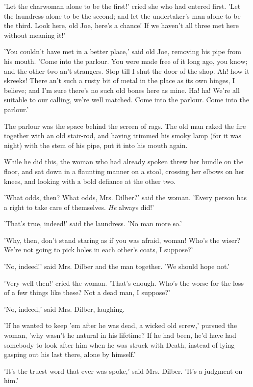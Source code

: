 'Let the charwoman alone to be the first!' cried she who had entered
first. 'Let the laundress alone to be the second; and let the
undertaker's man alone to be the third. Look here, old Joe, here's a
chance! If we haven't all three met here without meaning it!'

'You couldn't have met in a better place,' said old Joe, removing his
pipe from his mouth. 'Come into the parlour. You were made free of it
long ago, you know; and the other two an't strangers. Stop till I shut
the door of the shop. Ah! how it skreeks! There an't such a rusty bit of
metal in the place as its own hinges, I believe; and I'm sure there's no
such old bones here as mine. Ha! ha! We're all suitable to our calling,
we're well matched. Come into the parlour. Come into the parlour.'

The parlour was the space behind the screen of rags. The old man raked
the fire together with an old stair-rod, and having trimmed his smoky
lamp (for it was night) with the stem of his pipe, put it into his mouth
again.

While he did this, the woman who had already spoken threw her bundle on
the floor, and sat down in a flaunting manner on a stool, crossing her
elbows on her knees, and looking with a bold defiance at the other two.

'What odds, then? What odds, Mrs. Dilber?' said the woman. 'Every person
has a right to take care of themselves. \emph{He} always did!'

'That's true, indeed!' said the laundress. 'No man more so.'

'Why, then, don't stand staring as if you was afraid, woman! Who's the
wiser? We're not going to pick holes in each other's coats, I suppose?'

'No, indeed!' said Mrs. Dilber and the man together. 'We should hope
not.'

'Very well then!' cried the woman. 'That's enough. Who's the worse for
the loss of a few things like these? Not a dead man, I suppose?'

'No, indeed,' said Mrs. Dilber, laughing.

'If he wanted to keep 'em after he was dead, a wicked old screw,'
pursued the woman, 'why wasn't he natural in his lifetime? If he had
been, he'd have had somebody to look after him when he was struck with
Death, instead of lying gasping out his last there, alone by himself.'

'It's the truest word that ever was spoke,' said Mrs. Dilber. 'It's a
judgment on him.'

